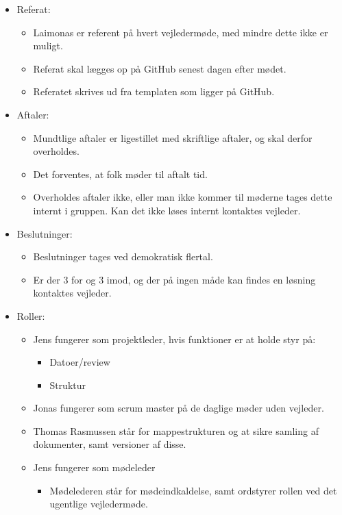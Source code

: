 \begin{itemize}
		\item Referat:
			\begin{itemize}
			\item Laimonas er referent på hvert vejledermøde, med mindre dette ikke er muligt.
			\item Referat skal lægges op på GitHub senest dagen efter mødet.
			\item Referatet skrives ud fra templaten som ligger på GitHub.
			\end{itemize}
		\item Aftaler:
			\begin{itemize}
			\item Mundtlige aftaler er ligestillet med skriftlige aftaler, og skal derfor overholdes.
			\item Det forventes, at folk møder til aftalt tid.
			\item Overholdes aftaler ikke, eller man ikke kommer til møderne tages dette internt i gruppen. Kan det ikke løses internt kontaktes vejleder. 
			\end{itemize}
		\item Beslutninger:
			\begin{itemize}
			\item Beslutninger tages ved demokratisk flertal.
			\item Er der 3 for og 3 imod, og der på ingen måde kan findes en løsning kontaktes vejleder.
			\end{itemize}
		\item Roller:
			\begin{itemize}
				\item Jens fungerer som projektleder, hvis funktioner er at holde styr på:
				\begin{itemize}
					\item Datoer/review
					\item Struktur
				\end{itemize}
				\item Jonas fungerer som scrum master på de daglige møder uden vejleder.
				\item Thomas Rasmussen står for mappestrukturen og at sikre samling af dokumenter, samt versioner af disse.
				\item Jens fungerer som mødeleder
				\begin{itemize}
					\item Mødelederen står for mødeindkaldelse, samt ordstyrer rollen ved det ugentlige vejledermøde. 
				\end{itemize} 
			\end{itemize}

\end{itemize}
